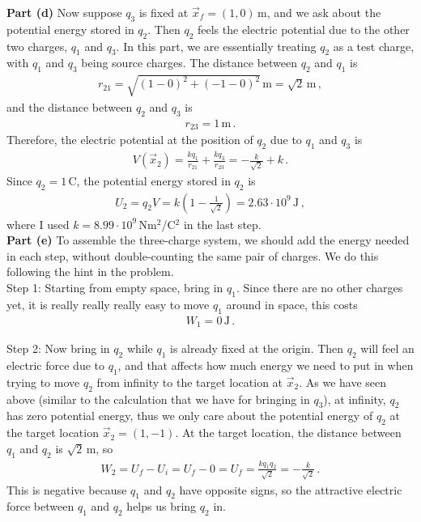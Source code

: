 \documentclass[11pt]{article}
\begin{document}
\noindent\textbf{Part (d)} Now suppose $q_3$ is fixed at $\vec{x}_f=(1,0)$\,m, and we ask about the potential energy stored in $q_2$. Then $q_2$ feels the electric potential due to the other two charges, $q_1$ and $q_3$. In this part, we are essentially treating $q_2$ as a test charge, with $q_1$ and $q_3$ being source charges. The distance between $q_2$ and $q_1$ is
\begin{align*}
r_{21}=\sqrt{(1-0)^2+(-1-0)^2} \,\text{m}=\sqrt{2}\,\text{m}\,,
\end{align*}
and the distance between $q_2$ and $q_3$ is
\begin{align*}
r_{23}=1\,\text{m}\,.
\end{align*}
Therefore, the electric potential at the position of $q_2$ due to $q_1$ and $q_3$ is
\begin{align*}
V(\vec{x}_2)=\frac{kq_1}{r_{21}}+\frac{kq_3}{r_{23}}
=-\frac{k}{\sqrt{2}}+k\,.
\end{align*}
Since $q_2=1$\,C, the potential energy stored in $q_2$ is
\begin{align*}
U_2=q_2V
= k\left(1-\frac{1}{\sqrt{2}}\right)
=2.63\cdot 10^9\,\text{J}\,,
\end{align*}
where I used $k=8.99\cdot 10^9$\,Nm$^2$/C$^2$ in the last step.\\

\noindent\textbf{Part (e)} To assemble the three-charge system, we should add the energy needed in each step, without double-counting the same pair of charges. We do this following the hint in the problem.\\

\noindent Step 1: Starting from empty space, bring in $q_1$. Since there are no other charges yet, it is really really really easy to move $q_1$ around in space, this costs
\begin{align*}
W_1=0\,\text{J}\,.
\end{align*}

\noindent Step 2: Now bring in $q_2$ while $q_1$ is already fixed at the origin. Then $q_2$ will feel an electric force due to $q_1$, and that affects how much energy we need to put in when trying to move $q_2$ from infinity to the target location at $\vec{x}_2$. As we have seen above (similar to the calculation that we have for bringing in $q_3$), at infinity, $q_2$ has zero potential energy, thus we only care about the potential energy of $q_2$ at the target location $\vec{x}_2 = (1,-1)$. At the target location, the distance between $q_1$ and $q_2$ is $\sqrt{2}$\,m, so
\begin{align*}
W_2=U_f - U_i = U_f - 0 = U_f = \frac{kq_1q_2}{\sqrt{2}}
=-\frac{k}{\sqrt{2}}\,.
\end{align*}
This is negative because $q_1$ and $q_2$ have opposite signs, so the attractive electric force between $q_1$ and $q_2$ helps us bring $q_2$ in.\\
\end{document}
